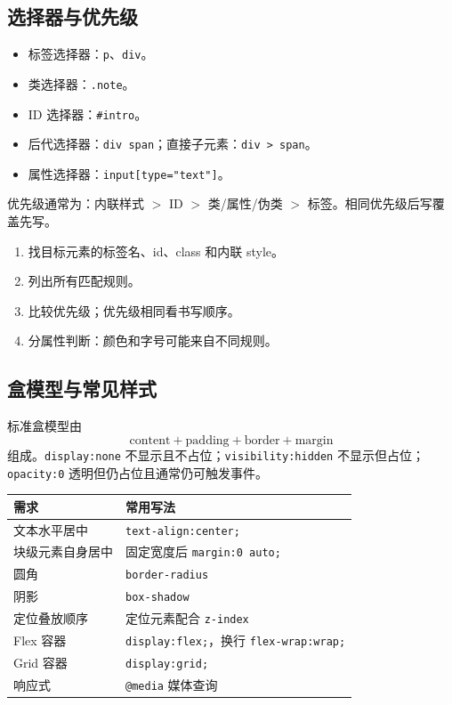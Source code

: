 \documentclass[UTF8,zihao=-4]{ctexart}
\begin{document}
\subsection{选择器与优先级}
\begin{keybox}[选择器速查]
\begin{itemize}
  \item 标签选择器：\texttt{p}、\texttt{div}。
  \item 类选择器：\texttt{.note}。
  \item ID 选择器：\texttt{\#intro}。
  \item 后代选择器：\texttt{div span}；直接子元素：\texttt{div > span}。
  \item 属性选择器：\texttt{input[type="text"]}。
\end{itemize}
优先级通常为：内联样式 $>$ ID $>$ 类/属性/伪类 $>$ 标签。相同优先级后写覆盖先写。
\end{keybox}

\begin{methodbox}
\begin{enumerate}
  \item 找目标元素的标签名、id、class 和内联 style。
  \item 列出所有匹配规则。
  \item 比较优先级；优先级相同看书写顺序。
  \item 分属性判断：颜色和字号可能来自不同规则。
\end{enumerate}
\end{methodbox}

\subsection{盒模型与常见样式}
\begin{keybox}[盒模型]
标准盒模型由
\[
\text{content} + \text{padding} + \text{border} + \text{margin}
\]
组成。\texttt{display:none} 不显示且不占位；\texttt{visibility:hidden} 不显示但占位；\texttt{opacity:0} 透明但仍占位且通常仍可触发事件。
\end{keybox}

\begin{longtable}{p{}p{}}
\toprule
\textbf{需求} & \textbf{常用写法} \\
\midrule
文本水平居中 & \texttt{text-align:center;} \\
块级元素自身居中 & 固定宽度后 \texttt{margin:0 auto;} \\
圆角 & \texttt{border-radius} \\
阴影 & \texttt{box-shadow} \\
定位叠放顺序 & 定位元素配合 \texttt{z-index} \\
Flex 容器 & \texttt{display:flex;}，换行 \texttt{flex-wrap:wrap;} \\
Grid 容器 & \texttt{display:grid;} \\
响应式 & \texttt{@media} 媒体查询 \\
\bottomrule
\end{longtable}
\end{document}
